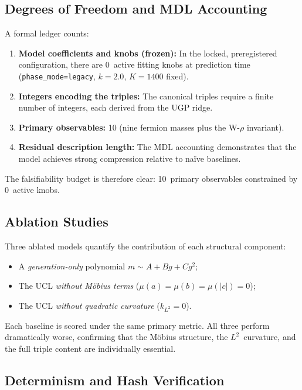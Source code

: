 \documentclass[11pt]{article}
\theoremstyle{remark}
\newcommand{\mob}{\mu}
\begin{document}
\subsection{Degrees of Freedom and MDL Accounting}

A formal ledger counts:
\begin{enumerate}[leftmargin=1.2em,itemsep=0.15em]
    \item \textbf{Model coefficients and knobs (frozen):} In the locked, preregistered configuration, there are 0~active fitting knobs at prediction time (\texttt{phase\_mode=legacy}, $k=2.0$, $K=1400$ fixed).
    \item \textbf{Integers encoding the triples:} The canonical triples require a finite number of integers, each derived from the UGP ridge.
    \item \textbf{Primary observables:} 10 (nine fermion masses plus the W-$\rho$ invariant).
    \item \textbf{Residual description length:} The MDL accounting demonstrates that the model achieves strong compression relative to na\"ive baselines.
\end{enumerate}
The falsifiability budget is therefore clear: 10~primary observables constrained by 0~active knobs.

\subsection{Ablation Studies}

Three ablated models quantify the contribution of each structural component:
\begin{itemize}[leftmargin=1.2em,itemsep=0.2em]
    \item A \emph{generation-only} polynomial $m \sim A + Bg + Cg^2$;
    \item The UCL \emph{without M\"obius terms} ($\mob(a) = \mob(b) = \mob(|c|) = 0$);
    \item The UCL \emph{without quadratic curvature} ($k_{L^2} = 0$).
\end{itemize}
Each baseline is scored under the same primary metric.
All three perform dramatically worse, confirming that the M\"obius structure, the $L^2$~curvature, and the full triple content are individually essential.

\subsection{Determinism and Hash Verification}
\end{document}
